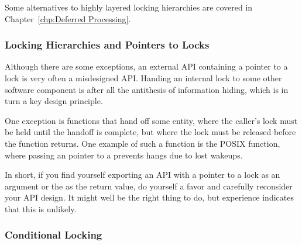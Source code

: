 Some alternatives to highly layered locking hierarchies are covered in
Chapter~\ref{chp:Deferred Processing}.

\subsubsection{Locking Hierarchies and Pointers to Locks}
\label{sec:locking:Locking Hierarchies and Pointers to Locks}

Although there are some exceptions, an external API containing a pointer
to a lock is very often a misdesigned API.
Handing an internal lock to some other software component is after all
the antithesis of information hiding, which is in turn a key design
principle.

\QuickQuizEnd

One exception is functions that hand off some entity,
where the caller's lock must be held until the handoff is complete,
but where the lock must be released before the function returns.
One example of such a function is the POSIX 
function, where passing an pointer to a 
prevents hangs due to lost wakeups.

\QuickQuizEnd

In short, if you find yourself exporting an API with a pointer to a
lock as an argument or the as the return value, do yourself a favor and
carefully reconsider your API design.
It might well be the right thing to do, but experience indicates that
this is unlikely.

\subsubsection{Conditional Locking}
\label{sec:locking:Conditional Locking}

